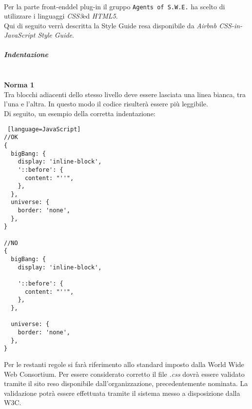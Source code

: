 \label{css} \-\\
Per la parte front-end\glossario del plug-in il gruppo \texttt{Agents of S.W.E.} ha scelto di utilizzare i linguaggi \textit{CSS3}\glossario ed \textit{HTML5}\glossario.\\
Qui di seguito verrà descritta la Style Guide resa disponibile da \textit{Airbnb CSS-in-JavaScript Style Guide}.

\subparagraph{Indentazione} \-\\
\textbf{Norma 1}\\
Tra blocchi adiacenti dello stesso livello deve essere lasciata una linea bianca, tra l'una e l'altra. In questo modo il codice risulterà essere più leggibile. \\
Di seguito, un esempio della corretta indentazione: 


\begin{lstlisting} [language=JavaScript]
//OK
{
  bigBang: {
    display: 'inline-block',
    '::before': {
      content: "''",
    },
  },
  universe: {
    border: 'none',
  },
}

//NO
{
  bigBang: {
    display: 'inline-block',

    '::before': {
      content: "''",
    },
  },

  universe: {
    border: 'none',
  },
}
\end{lstlisting}

Per le restanti regole si farà riferimento allo standard imposto dalla World Wide Web Consortium. Per essere considerato corretto il file \textit{.css} dovrà essere validato tramite il sito reso disponibile dall'organizzazione, precedentemente nominata. La validazione potrà essere effettuata tramite il sistema messo a disposizione dalla W3C.